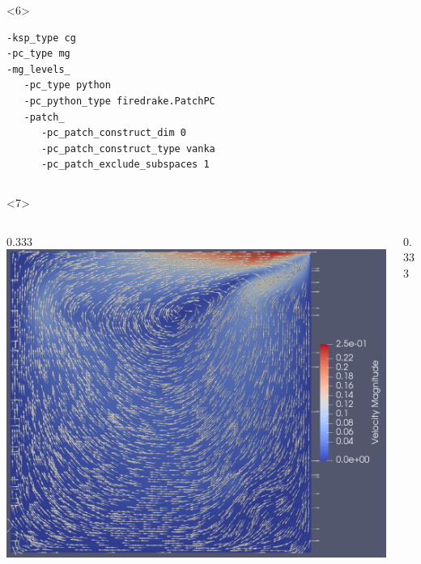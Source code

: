 \documentclass[presentation,aspectratio=43, 10pt]{beamer}
\begin{document}
\begin{frame}[fragile, t]
\begin{onlyenv}
\begin{columns}
\begin{column}{0.6\textwidth}
\begin{onlyenv}
\begin{verbatim}
\end{verbatim}
        \end{onlyenv}
        \begin{onlyenv}<6>
\begin{verbatim}
-ksp_type cg
-pc_type mg
-mg_levels_
   -pc_type python
   -pc_python_type firedrake.PatchPC
   -patch_
      -pc_patch_construct_dim 0
      -pc_patch_construct_type vanka
      -pc_patch_exclude_subspaces 1
\end{verbatim}
        \end{onlyenv}
      \end{column}
    \end{columns}
  \end{onlyenv}
  \begin{onlyenv}<7>
    \begin{columns}
      \begin{column}{0.333\pagewidth}
        \includegraphics[width=\textwidth]{stokes-velocity}
      \end{column}
      \begin{column}{0.333\pagewidth}

\end{column}
\end{columns}
\end{onlyenv}
\end{frame}
\end{document}
